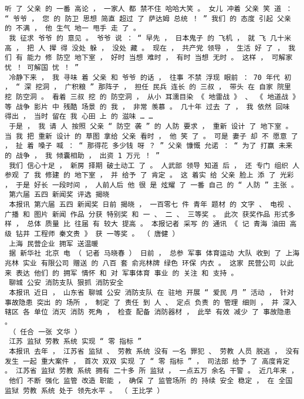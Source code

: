 \documentclass{article}
\begin{document}
\begin{Verbatim}[commandchars=\\\{\}]
 听 了 父亲 的 一番 高论 ， 一家人 都 禁不住 哈哈大笑 。 女儿 冲着 父亲 笑 道 ： “ 爷爷 ， 您 的 防卫 思想 简直 超过 了 萨达姆 总统 ！ ” 我们 的 态度 引起 父亲 的 不满 ， 他 生气 地一 甩手 走 了 。 
 我 征求 爷爷 的 意见 。 爷爷 说 ： “ 早先 ， 日本鬼子 的 飞机 ， 就 飞 几十米 高 ， 把 人 撵 得 没处 躲 ， 没处 藏 。 现在 ， 共产党 领导 ， 生活 好 了 ， 我们 有 能力 修 防空 地下室 ， 好时 当想 难时 ， 有时 当想 无时 。 这样 ， 可解家 忧 ！ 可解国 忧 ！ ” 
 冷静下来 ， 我 寻味 着 父亲 和 爷爷 的话 ， 往事 不禁 浮现 眼前 ： 70 年代 初 ， “ 深 挖洞 ， 广积粮 ” 那阵子 ， 担任 民兵 连长 的 三叔 ， 带头 在 自家 院里 挖 防空洞 。 看着 三叔 挖 的 防空洞 ， 从小 耳濡目染 《 地雷战 》 、 《 地道战 》 等 战争 影片 中 残酷 场景 的 我 ， 非常 羡慕 。 几十年 过去 了 ， 我 依然 回味 得出 ， 当时 留在 我 心田 上 的 滋味 … … 
 于是 ， 我 请 人 按照 父亲 “ 防空 袭 ” 的 人防 要求 ， 重新 设计 了 地下室 。 当 我 把 重新 设计 的 草图 拿给 父亲 看时 ， 他 笑 了 。 可是 妻子 却 不 愿意 了 ， 扯 着 嗓子 喊 ： “ 那得花 多少钱 呀 ？ ” 父亲 慷慨 允诺 ： “ 为了 打赢 未来 的 战争 ， 我 倾囊相助 ， 出资 1 万元 ！ ” 
 我们 信心十足 ， 新房 择期 破土动工 了 。 人武部 领导 知道 后 ， 还 专门 组织 人 参观 了 我 修建 的 地下室 ， 并 给予 了 肯定 。 这 着实 给 父亲 脸上 添 了 光彩 ， 于是 好长 一段时间 ， 人前人后 他 很 是 炫耀 了 一番 自己 的 “ 人防 ” 主张 。 
 第六届 五四 新闻奖 评选 揭晓 
 本报讯 第六届 五四 新闻奖 日前 揭晓 ， 一百零七 件 青年 题材 的 文字 、 电视 、 广播 和 图片 新闻 作品 分获 特别奖 和 一 、 二 、 三等奖 。 此次 获奖作品 形式多样 ， 总体 质量 比 往届 有 较大 提高 。 本报记者 采写 的 通讯 《 记 青海 油田 高级 钻井 工程师 秦文贵 》 获 一等奖 。 （ 唐健 ） 
 上海 民营企业 拥军 送温暖 
 据 新华社 北京 电 （ 记者 马晓春 ） 日前 ， 总参 军事 体育运动 大队 收到 了 上海 兆林 实业 有限公司 赠送 的 八百 套 俞兆林牌 绿色 环保 内衣 。 这家 民营公司 以此 来 表达 他们 的 拥军 情怀 和 对 军事体育 事业 的 关注 和 支持 。 
 聊城 公安 消防支队 狠抓 消防安全 
 本报讯 近日 ， 山东省 聊城 公安 消防支队 在 驻地 开展 “ 爱民 月 ” 活动 ， 针对 事故隐患 突出 的 场所 ， 制定 了 责任 到 人 、 定点 负责 的 管理 细则 ， 并 深入 辖区 各 单位 消灭 消防 死角 ， 检查 配备 消防器材 ， 此举 有效 减少 了 事故隐患 。 
 （ 任合 一张 文华 ） 
 江苏 监狱 劳教 系统 实现 “ 零 指标 ” 
 本报讯 去年 ， 江苏省 监狱 、 劳教 系统 没有 一名 罪犯 、 劳教 人员 脱逃 ， 没有 发生 一起 重大案件 ， 首次 双双 实现 了 “ 零 指标 ” ， 司法部 给予 了 高度肯定 。 江苏省 监狱 劳教 系统 拥有 二十多 所 监狱 ， 一点五万 余名 干警 。 近几年来 ， 
 他们 不断 强化 监管 改造 职能 ， 确保 了 监管场所 的 持续 安全 稳定 ， 在 全国 监狱 劳教 系统 处于 领先水平 。 （ 王比学 ） 

\end{Verbatim}
\end{document}
